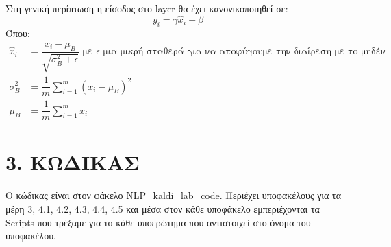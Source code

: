 \documentclass{article}
\begin{document}
\\[2mm]
Στη γενική περίπτωση η είσοδος στο layer θα έχει κανονικοποιηθεί σε: 
\begin{equation*}
y_i = \gamma\hat{x}_i + \beta
\end{equation*}
\vspace*{1.5mm}
Όπου:
%
\begin{equation*}
\begin{split}
\hat{x}_i &= \dfrac{x_i - \mu_B}{\sqrt{\sigma_B^2 + \epsilon}}  \text{ με $\epsilon$ μια μικρή σταθερά για να αποφύγουμε την διαίρεση με το μηδέν} \\
\sigma_B^2 &= \dfrac{1}{m}\sum_{i=1}^m\left(x_i - \mu_B\right)^2\\
\mu_B &= \dfrac{1}{m}\sum_{i=1}^{m}x_i
\end{split}
\end{equation*}

\section*{3. ΚΩΔΙΚΑΣ}
Ο κώδικας είναι στον φάκελο NLP\_kaldi\_lab\_code. Περιέχει υποφακέλους για τα μέρη 3, 4.1, 4.2, 4.3, 4.4, 4.5 και μέσα στον κάθε υποφάκελο εμπεριέχονται τα Scripts που τρέξαμε για το κάθε υποερώτημα που αντιστοιχεί στο όνομα του υποφακέλου.
\end{document}
